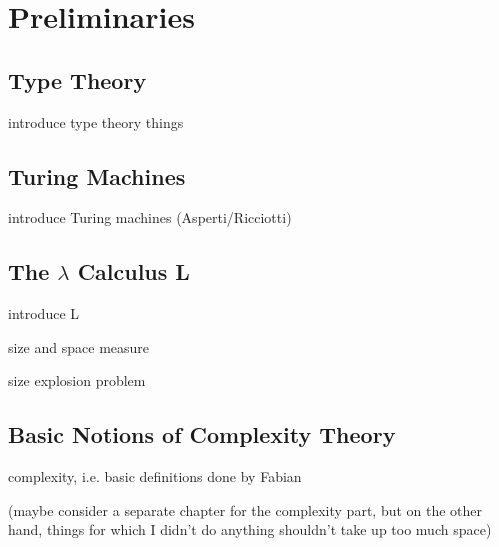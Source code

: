 \chapter{Preliminaries}

\section{Type Theory}
introduce type theory things

\section{Turing Machines}
introduce Turing machines (Asperti/Ricciotti)

\section{The $\lambda$ Calculus L}
introduce L 

size and space measure

size explosion problem

\section{Basic Notions of Complexity Theory}
complexity, i.e. basic definitions done by Fabian

(maybe consider a separate chapter for the complexity part, but on the other hand, things for which I didn't do anything shouldn't take up too much space)



